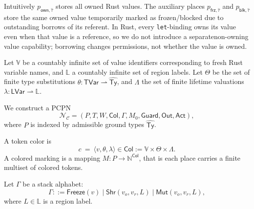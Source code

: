 \documentclass[runningheads]{llncs}
\begin{document}
Intuitively $p_{\mathsf{own},\hat\tau}$ stores all owned Rust values. The auxiliary places $p_{\mathsf{frz},\hat\tau}$ and $p_{\mathsf{blk},\hat\tau}$ store the same owned value temporarily marked as frozen/blocked due to outstanding borrows of its referent. In Rust, every \texttt{let}-binding owns its value even when that value is a reference, so we do not introduce a separatenon-owning value capability; borrowing changes permissions, not whether the value is owned.

Let $\mathbb{V}$ be a countably infinite set of value identifiers corresponding to fresh Rust variable names, and $\mathbb{L}$ a countably infinite set of region labels. Let $\Theta$ be the set of finite type substitutions $\theta:\mathsf{TVar}\rightharpoonup \widehat{\mathsf{Ty}}$, and $\Lambda$ the set of finite lifetime valuations $\lambda:\mathsf{LVar}\rightharpoonup \mathbb{L}$.

We construct a PCPN
\begin{equation*}
     \mathcal{N}_{\mathcal{C}}=(P,T,W,\mathsf{Col},\Gamma,M_0,\mathsf{Guard},\mathsf{Out},\mathsf{Act}),
\end{equation*}
where $P$ is indexed by admissible ground types $\widehat{\mathsf{Ty}}$.

A token color is
\begin{equation*}
     c ~=~ \langle v,\theta,\lambda\rangle \in \mathsf{Col} := \mathbb{V}\times\Theta\times\Lambda.
\end{equation*}
A colored marking is a mapping $M: P \to \mathbb{N}^{\mathsf{Col}}$, that is each place carries a finite multiset of colored tokens.

Let $\Gamma$ be a stack alphabet:
\begin{equation*}
    \Gamma ::= \mathsf{Freeze}(v)\mid \mathsf{Shr}(v_o,v_r,L)\mid \mathsf{Mut}(v_o,v_r,L),
\end{equation*}
where $L\in\mathbb{L}$ is a region label.
\end{document}
